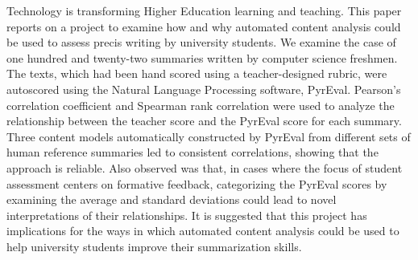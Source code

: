 Technology is transforming Higher Education learning and teaching. This paper reports on a project to examine how and why automated content analysis could be used to assess precis writing by university students. We examine the case of one hundred and twenty-two summaries written by computer science freshmen. The texts, which had been hand scored using a teacher-designed rubric, were autoscored using the Natural Language Processing software, PyrEval. Pearson's correlation coefficient and Spearman rank correlation were used to analyze the relationship between the teacher score and the PyrEval score for each summary. Three content models automatically constructed by PyrEval from different sets of human reference summaries led to consistent correlations, showing that the approach is reliable. Also observed was that, in cases where the focus of student assessment centers on formative feedback, categorizing the PyrEval scores by examining the average and standard deviations could lead to novel interpretations of their relationships. It is suggested that this project has implications for the ways in which automated content analysis could be used to help university students improve their summarization skills.

